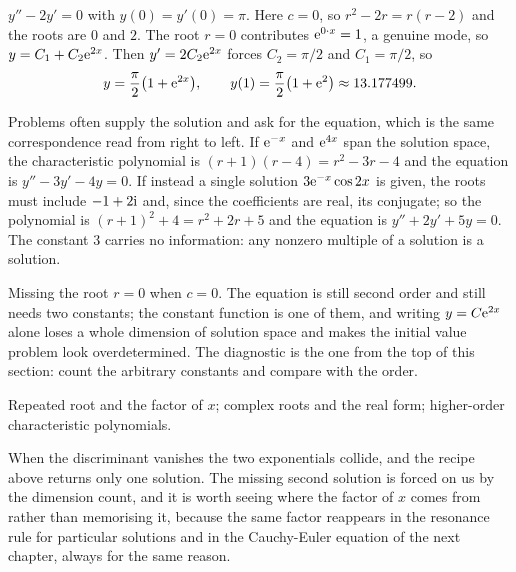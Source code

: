 \begin{worked}
$y''-2y'=0$ with $y(0)=y'(0)=\pi$. Here $c=0$, so $r^{2}-2r=r(r-2)$ and the roots are $0$ and $2$. The root $r=0$ contributes $\mathrm{e}^{0\cdot x}=1$, a genuine mode, so $y=C_1+C_2\mathrm{e}^{2x}$. Then $y'=2C_2\mathrm{e}^{2x}$ forces $C_2=\pi/2$ and $C_1=\pi/2$, so
\[y=\frac{\pi}{2}\bigl(1+\mathrm{e}^{2x}\bigr),\qquad y(1)=\frac{\pi}{2}\bigl(1+\mathrm{e}^{2}\bigr)\approx13.177499.\]
\end{worked}

\begin{worked}
Problems often supply the solution and ask for the equation, which is the same correspondence read from right to left. If $\mathrm{e}^{-x}$ and $\mathrm{e}^{4x}$ span the solution space, the characteristic polynomial is $(r+1)(r-4)=r^{2}-3r-4$ and the equation is $y''-3y'-4y=0$. If instead a single solution $3\mathrm{e}^{-x}\cos2x$ is given, the roots must include $-1+2\mathrm{i}$ and, since the coefficients are real, its conjugate; so the polynomial is $(r+1)^{2}+4=r^{2}+2r+5$ and the equation is $y''+2y'+5y=0$. The constant $3$ carries no information: any nonzero multiple of a solution is a solution.
\end{worked}

\begin{trap}
Missing the root $r=0$ when $c=0$. The equation is still second order and still needs two constants; the constant function is one of them, and writing $y=C\mathrm{e}^{2x}$ alone loses a whole dimension of solution space and makes the initial value problem look overdetermined. The diagnostic is the one from the top of this section: count the arbitrary constants and compare with the order.
\end{trap}

\begin{seealsob}Repeated root and the factor of $x$; complex roots and the real form; higher-order characteristic polynomials.\end{seealsob}

When the discriminant vanishes the two exponentials collide, and the recipe above returns only one solution. The missing second solution is forced on us by the dimension count, and it is worth seeing where the factor of $x$ comes from rather than memorising it, because the same factor reappears in the resonance rule for particular solutions and in the Cauchy-Euler equation of the next chapter, always for the same reason.


